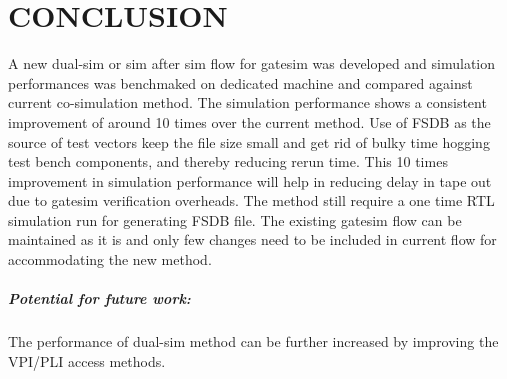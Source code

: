 \chapter{CONCLUSION}
\label{chap:conclusion}
A new dual-sim or sim after sim flow for gatesim was developed and simulation performances was benchmaked on dedicated machine and compared against current co-simulation method. The simulation performance shows a consistent improvement of around 10 times over the current method. Use of FSDB as the source of test vectors keep the file size small and get rid of bulky time hogging test bench components, and thereby reducing rerun time. This 10 times improvement in simulation performance will help in reducing delay in tape out due to gatesim verification overheads. The method still require a one time RTL simulation run for generating FSDB file. The existing gatesim flow can be maintained as it is and only few changes need to be included in current flow for accommodating the new method. 
\paragraph{Potential for future work:}The performance of dual-sim method can be further increased by improving the VPI/PLI access methods. 